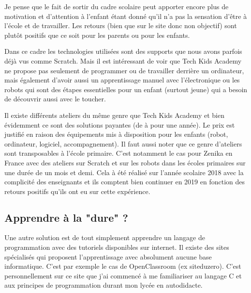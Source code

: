 Je pense que le fait de sortir du cadre scolaire peut apporter encore plus de motivation et d'attention à l'enfant étant donné qu'il n'a pas la sensation d'être à l'école et de travailler. Les retours (bien que sur le site donc non objectif) sont plutôt positifs que ce soit pour les parents ou pour les enfants.

Dans ce cadre les technologies utilisées sont des supports que nous avons parfois déjà vus comme Scratch. Mais il est intéressant de voir que Tech Kids Academy ne propose pas seulement de programmer ou de travailler derrière un ordinateur, mais également d'avoir aussi un apprentissage manuel avec l'électronique ou les robots qui sont des étapes essentielles pour un enfant (surtout jeune) qui a besoin de découvrir aussi avec le toucher.

Il existe différents ateliers du même genre que Tech Kids Academy et bien évidemment ce sont des solutions payantes (de  à  pour une année). Le prix est justifié en raison des équipements mis à disposition pour les enfants (robot, ordinateur, logiciel, accompagnement). Il faut aussi noter que ce genre d'ateliers sont transposables à l'école primaire. C'est notamment le cas pour Zenika en France \cite{46} avec des ateliers sur Scratch et sur les robots dans les écoles primaires sur une durée de un mois et demi. Cela à été réalisé sur l'année scolaire 2018 avec la complicité des enseignants et ils comptent bien continuer en 2019 en fonction des retours positifs qu'ils ont eu sur cette expérience.


\newpage

\subsection{Apprendre à la "dure" ?}

Une autre solution est de tout simplement apprendre un langage de programmation avec des tutoriels disponibles sur internet. Il existe des sites spécialisés qui proposent l'apprentissage avec absolument aucune base informatique. C'est par exemple le cas de OpenClassroom (ex siteduzero). \cite{47} C'est personnellement sur ce site que j'ai commencé à me familiariser au langage C et aux principes de programmation durant mon lycée en autodidacte.

